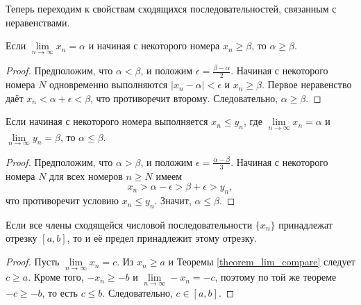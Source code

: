 Теперь переходим к свойствам сходящихся последовательностей, связанным с неравенствами.

\begin{theorem} \label{theorem_lim_compare}
Если \(\lim\limits_{n \to \infty}x_{n} = \alpha\) и начиная с некоторого
номера \(x_{n} \geq \beta\), то \(\alpha \geq \beta\).

\begin{proof}
Предположим, что \(\alpha < \beta\), и положим
\(\epsilon = \frac{\beta - \alpha}{2}\). Начиная с некоторого
номера \(N\) одновременно выполняются \(|x_{n} - \alpha| < \epsilon\)
и \(x_{n} \geq \beta\). Первое неравенство даёт
\(x_{n} < \alpha + \epsilon < \beta\), что противоречит второму.
Следовательно, \(\alpha \geq \beta\).
\end{proof}
\end{theorem}

\begin{theorem}
Если начиная с некоторого номера выполняется \(x_{n} \leq y_{n}\),
где \({\lim\limits_{n \to \infty}x_{n} = \alpha}\) и
\(\lim\limits_{n \to \infty} y_{n} = \beta\), то \(\alpha \leq \beta\).

\begin{proof}
Предположим, что \(\alpha > \beta\), и положим
\(\epsilon = \frac{\alpha - \beta}{3}\). Начиная с некоторого номера \(N\)
для всех номеров \(n \geq N\) имеем
\[
x_{n} > \alpha - \epsilon > \beta + \epsilon > y_{n},
\]
что противоречит условию \(x_{n} \leq y_{n}\). Значит, \(\alpha \leq \beta\).
\end{proof}
\end{theorem}

\begin{theorem} \label{2:theorem_lim_in_interval}
Если все члены сходящейся числовой последовательности \(\{x_{n}\}\)
принадлежат отрезку \([a,b]\), то и её предел принадлежит этому
отрезку.

\begin{proof}
Пусть \(\lim\limits_{n \to \infty} x_{n} = c\). Из \(x_{n} \geq a\) и
Теоремы \ref{theorem_lim_compare} следует \(c \geq a\). Кроме того, \( -x_{n} \geq -b\) и
\(\lim\limits_{n \to \infty} -x_{n} = -c\), поэтому по той же теореме \(-c \geq -b\),
то есть \(c \leq b\). Следовательно, \(c \in [a,b]\).
\end{proof}
\end{theorem}


